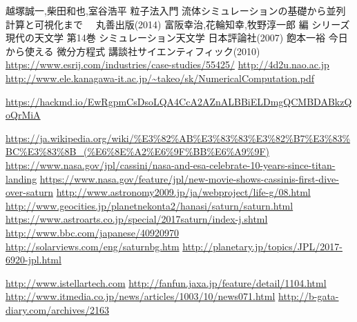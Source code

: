 \begin{thebibliography}{99}
\bibitem{} 越塚誠一,柴田和也,室谷浩平  粒子法入門 流体シミュレーションの基礎から並列計算と可視化まで 　丸善出版(2014)
\bibitem{} 富阪幸治,花輪知幸,牧野淳一郎 編  シリーズ現代の天文学 第14巻 シミュレーション天文学  日本評論社(2007)
\bibitem{} 飽本一裕  今日から使える 微分方程式  講談社サイエンティフィック(2010)
 \url{https://www.esrij.com/industries/case-studies/55425/}
\bibitem{} \url{http://4d2u.nao.ac.jp}
\bibitem{} \url{http://www.ele.kanagawa-it.ac.jp/~takeo/sk/NumericalComputation.pdf}

\bibitem{} \url{https://hackmd.io/EwRgpmCsDsoLQA4CcA2AZnALBBiELDmgQCMBDABkzQoQrMiA}

\bibitem{} \url{https://ja.wikipedia.org/wiki/%E3%82%AB%E3%83%83%E3%82%B7%E3%83%BC%E3%83%8B_(%E6%8E%A2%E6%9F%BB%E6%A9%9F)}
\bibitem{} \url{https://www.nasa.gov/jpl/cassini/nasa-and-esa-celebrate-10-years-since-titan-landing}
\bibitem{} \url{https://www.nasa.gov/feature/jpl/new-movie-shows-cassinis-first-dive-over-saturn}
\bibitem{} \url{http://www.astronomy2009.jp/ja/webproject/life-g/08.html}
\bibitem{} \url{http://www.geocities.jp/planetnekonta2/hanasi/saturn/saturn.html}
\bibitem{} \url{https://www.astroarts.co.jp/special/2017saturn/index-j.shtml}
\bibitem{} \url{http://www.bbc.com/japanese/40920970}
\bibitem{} \url{http://solarviews.com/eng/saturnbg.htm}
\bibitem{} \url{http://planetary.jp/topics/JPL/2017-6920-jpl.html}

\bibitem{} \url{http://www.istellartech.com}
\bibitem{} \url{http://fanfun.jaxa.jp/feature/detail/1104.html}
\bibitem{} \url{http://www.itmedia.co.jp/news/articles/1003/10/news071.html}
\bibitem{} \url{http://b-gata-diary.com/archives/2163}

\end{thebibliography}
